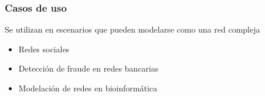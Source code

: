 



\begin{frame}
    \frametitle{Casos de uso}

   Se utilizan en escenarios que pueden modelarse como una red compleja

    \begin{itemize}
        \item Redes sociales
        \item Detección de fraude en redes bancarias
        \item Modelación de redes en bioinformática
    \end{itemize}

\end{frame}



